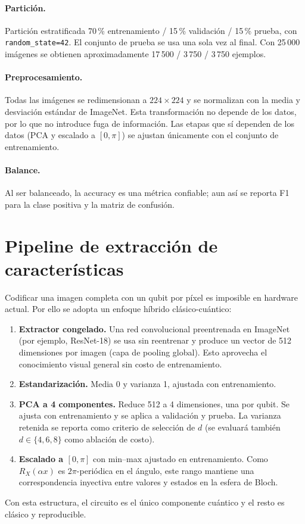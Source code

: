\documentclass[11pt,letterpaper]{article}
\begin{document}
\paragraph{Partición.} Partición estratificada 70\,\% entrenamiento / 15\,\% validación /
15\,\% prueba, con \texttt{random\_state=42}. El conjunto de prueba se usa una sola vez al final.
Con 25\,000 imágenes se obtienen aproximadamente 17\,500 / 3\,750 / 3\,750 ejemplos.

\paragraph{Preprocesamiento.} Todas las imágenes se redimensionan a $224\times224$ y se normalizan
con la media y desviación estándar de ImageNet. Esta transformación no depende de los datos, por lo
que no introduce fuga de información. Las etapas que sí dependen de los datos (PCA y escalado a
$[0,\pi]$) se ajustan únicamente con el conjunto de entrenamiento.

\paragraph{Balance.} Al ser balanceado, la accuracy es una métrica confiable; aun así se reporta F1
para la clase positiva y la matriz de confusión.

\section{Pipeline de extracción de características}
Codificar una imagen completa con un qubit por píxel es imposible en hardware actual. Por ello se
adopta un enfoque híbrido clásico-cuántico:
\begin{enumerate}[leftmargin=*]
\item \textbf{Extractor congelado.} Una red convolucional preentrenada en ImageNet (por ejemplo,
ResNet-18) se usa sin reentrenar y produce un vector de 512 dimensiones por imagen (capa de pooling
global). Esto aprovecha el conocimiento visual general sin costo de entrenamiento.
\item \textbf{Estandarización.} Media 0 y varianza 1, ajustada con entrenamiento.
\item \textbf{PCA a 4 componentes.} Reduce 512 a 4 dimensiones, una por qubit. Se ajusta con
entrenamiento y se aplica a validación y prueba. La varianza retenida se reporta como criterio de
selección de $d$ (se evaluará también $d\in\{4,6,8\}$ como ablación de costo).
\item \textbf{Escalado a $[0,\pi]$} con min--max ajustado en entrenamiento. Como $R_X(\alpha x)$ es
$2\pi$-periódica en el ángulo, este rango mantiene una correspondencia inyectiva entre valores y
estados en la esfera de Bloch.
\end{enumerate}
Con esta estructura, el circuito es el único componente cuántico y el resto es clásico y
reproducible.
\end{document}
